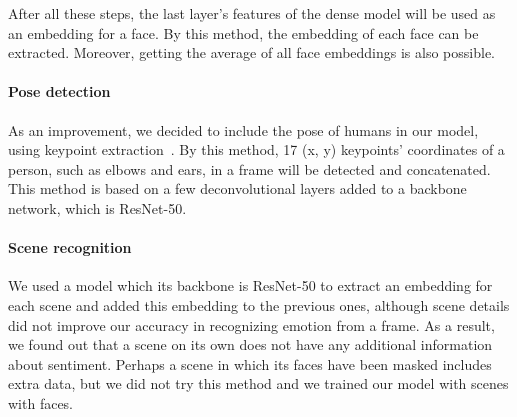 After all these steps, the last layer's features of the dense model will be used as an embedding for a face. By this method, the embedding of each face can be extracted. Moreover, getting the average of all face embeddings is also possible.

\paragraph{Pose detection} As an improvement, we decided to include the pose of humans in our model, using keypoint extraction~\cite{xiao2018simple}. By this method, 17 (x, y) keypoints' coordinates of a person, such as elbows and ears, in a frame will be detected and concatenated. This method is based on a few deconvolutional layers added to a backbone network, which is ResNet-50.

\paragraph{Scene recognition} We used a model which its backbone is ResNet-50 to extract an embedding for each scene and added this embedding to the previous ones, although scene details did not improve our accuracy in recognizing emotion from a frame. As a result, we found out that a scene on its own does not have any additional information about sentiment. Perhaps a scene in which its faces have been masked includes extra data, but we did not try this method and we trained our model with scenes with faces.


